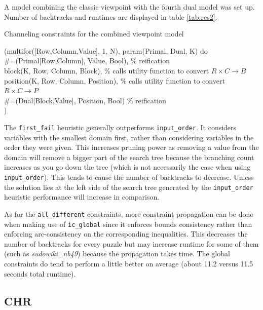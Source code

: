 A model combining the classic viewpoint with the fourth dual model was set up. Number of backtracks and runtimes are displayed in table \ref{tab:res2}.

\begin{snippet}[H]
\caption{Channeling constraints for the combined viewpoint model}\label{channeling}
\small
(multifor([Row,Column,Value], 1, N), param(Primal, Dual, K) do \\
    \qquad\#=(Primal[Row,Column], Value, Bool), \% reification \\
    \qquad block(K, Row, Column, Block), \% calls utility function to convert $R\times C\rightarrow B$ \\
    \qquad position(K, Row, Column, Position), \% calls utility function to convert $R\times C\rightarrow P$ \\
    \qquad\#=(Dual[Block,Value], Position, Bool) \% reification\\
)
\end{snippet}

The \texttt{first\_fail} heuristic generally outperforms \texttt{input\_order}. It considers variables with the smallest domain first, rather than considering variables in the order they were given. This increases pruning power as removing a value from the domain will remove a bigger part of the search tree because the branching count increases as you go down the tree (which is not necessarily the case when using \texttt{input\_order}). This tends to cause the number of backtracks to decrease. Unless the solution lies at the left side of the search tree generated by the \texttt{input\_order} heuristic performance will increase in comparison. \\\par

As for the \texttt{all\_different} constraints, more constraint propagation can be done when making use of \texttt{ic\_global} since it enforces bounds consistency rather than enforcing arc-consistency on the corresponding inequalities. This decreases the number of backtracks for every puzzle but may increase runtime for some of them (such as \textit{sudowiki\_nb49}) because the propagation takes time. The global constraints do tend to perform a little better on average (about 11.2 versus 11.5 seconds total runtime).

\subsection{CHR}

